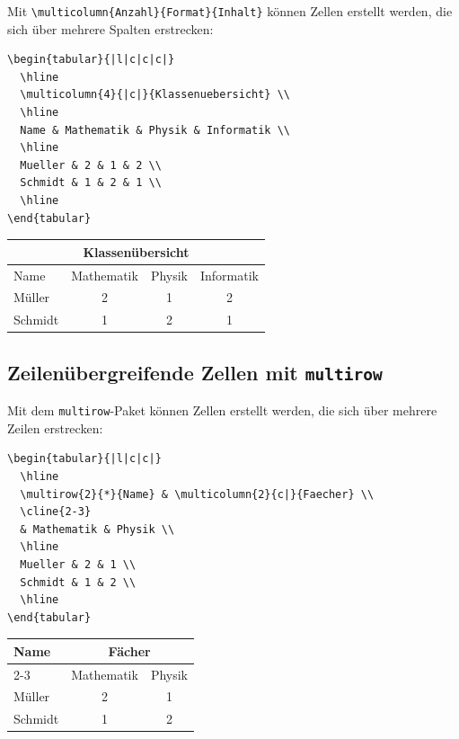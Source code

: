 \documentclass[12pt,a4paper]{article}
\begin{document}
Mit \texttt{\textbackslash multicolumn\{Anzahl\}\{Format\}\{Inhalt\}} können Zellen erstellt werden, die sich über mehrere Spalten erstrecken:

\begin{lstlisting}[style=latex]
\begin{tabular}{|l|c|c|c|}
  \hline
  \multicolumn{4}{|c|}{Klassenuebersicht} \\
  \hline
  Name & Mathematik & Physik & Informatik \\
  \hline
  Mueller & 2 & 1 & 2 \\
  Schmidt & 1 & 2 & 1 \\
  \hline
\end{tabular}
\end{lstlisting}

\begin{ausgabe}
\begin{center}
\begin{tabular}{|l|c|c|c|}
  \hline
  \multicolumn{4}{|c|}{Klassenübersicht} \\
  \hline
  Name & Mathematik & Physik & Informatik \\
  \hline
  Müller & 2 & 1 & 2 \\
  Schmidt & 1 & 2 & 1 \\
  \hline
\end{tabular}
\end{center}
\end{ausgabe}

\subsection{Zeilenübergreifende Zellen mit \texttt{multirow}}

Mit dem \texttt{multirow}-Paket können Zellen erstellt werden, die sich über mehrere Zeilen erstrecken:

\begin{lstlisting}[style=latex]
\begin{tabular}{|l|c|c|}
  \hline
  \multirow{2}{*}{Name} & \multicolumn{2}{c|}{Faecher} \\
  \cline{2-3}
  & Mathematik & Physik \\
  \hline
  Mueller & 2 & 1 \\
  Schmidt & 1 & 2 \\
  \hline
\end{tabular}
\end{lstlisting}

\begin{ausgabe}
\begin{center}
\begin{tabular}{|l|c|c|}
  \hline
  \multirow{2}{*}{Name} & \multicolumn{2}{c|}{Fächer} \\
  \cline{2-3}
  & Mathematik & Physik \\
  \hline
  Müller & 2 & 1 \\
  Schmidt & 1 & 2 \\
  \hline
\end{tabular}
\end{center}
\end{ausgabe}
\end{document}
